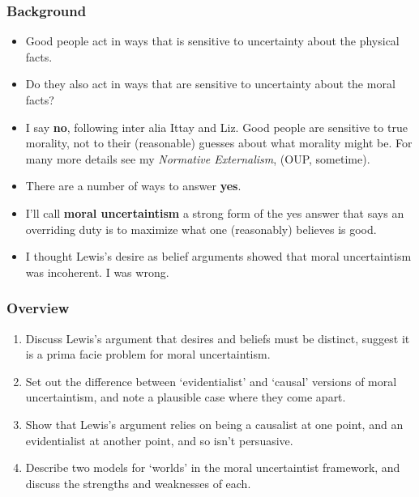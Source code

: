 
\def\mytitle{Moral Uncertainty and Desire as Belief}
\def\myauthor{Brian Weatherson}
\def\mydate{June, 2018}


\begin{frame}[fragile]
\frametitle{Background}
\label{background}

\begin{itemize}
\item{} Good people act in ways that is sensitive to uncertainty about the physical facts.

\item{} Do they also act in ways that are sensitive to uncertainty about the moral facts? \pause 

\item{} I say \textbf{no}, following inter alia Ittay and Liz. Good people are sensitive to true morality, not to their (reasonable) guesses about what morality might be. \pause For many more details see my \textit{Normative Externalism}, (OUP, sometime).

\item{} There are a number of ways to answer \textbf{yes}.

\item{} I’ll call \textbf{moral uncertaintism} a strong form of the yes answer that says an overriding duty is to maximize what one (reasonably) believes is good.

\item{} I thought Lewis's desire as belief arguments showed that moral uncertaintism was incoherent. \pause  I was wrong.

\end{itemize}

\end{frame}

\begin{frame}[fragile]
\frametitle{Overview}
\label{overview}

\begin{enumerate}
\item{} Discuss Lewis's argument that desires and beliefs must be distinct, suggest it is a prima facie problem for moral uncertaintism.

\item{} Set out the difference between `evidentialist' and `causal' versions of moral uncertaintism, and note a plausible case where they come apart.

\item{} Show that Lewis's argument relies on being a causalist at one point, and an evidentialist at another point, and so isn't persuasive.

\item{} Describe two models for `worlds' in the moral uncertaintist framework, and discuss the strengths and weaknesses of each.

\end{enumerate}

\end{frame}

